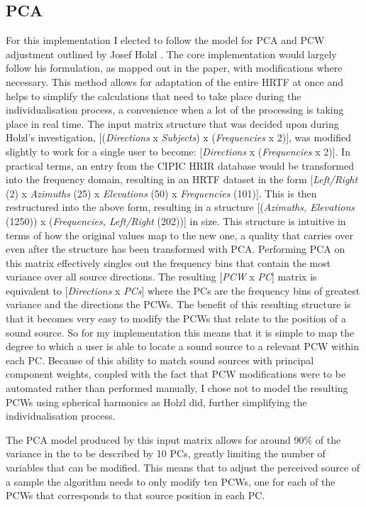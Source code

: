 \subsection{PCA}
For this implementation I elected to follow the model for PCA and PCW adjustment outlined by Josef Holzl \citep{Holzl2014a}. The core implementation would largely follow his formulation, as mapped out in the paper, with modifications where necessary. This method allows for adaptation of the entire HRTF at once and helps to simplify the calculations that need to take place during the individualisation process, a convenience when a lot of the processing is taking place in real time. The input matrix structure that was decided upon during Holzl's investigation, [(\textit{Directions} x \textit{Subjects}) x (\textit{Frequencies} x 2)], was modified slightly to work for a single user to become: [\textit{Directions} x (\textit{Frequencies} x 2)]. In practical terms, an entry from the CIPIC HRIR database would be transformed into the frequency domain, resulting in an HRTF dataset in the form [\textit{Left/Right} (2) x \textit{Azimuths} (25) x \textit{Elevations} (50) x \textit{Frequencies} (101)]. This is then restructured into the above form, resulting in a structure [(\textit{Azimuths, Elevations} (1250)) x (\textit{Frequencies, Left/Right} (202))] in size. This structure is intuitive in terms of how the original values map to the new one, a quality that carries over even after the structure has been transformed with PCA. Performing PCA on this matrix effectively singles out the frequency bins that contain the most variance over all source directions. The resulting [\textit{PCW} x \textit{PC}] matrix is equivalent to [\textit{Directions} x \textit{PCs}] where the PCs are the frequency bins of greatest variance and the directions the PCWs. The benefit of this resulting structure is that it becomes very easy to modify the PCWs that relate to the position of a sound source. So for my implementation this means that it is simple to map the degree to which a user is able to locate a sound source to a relevant PCW within each PC. Because of this ability to match sound sources with principal component weights, coupled with the fact that PCW modifications were to be automated rather than performed manually, I chose not to model the resulting PCWs using spherical harmonics as Holzl did, further simplifying the individualisation process. 

The PCA model produced by this input matrix allows for around 90\% of the variance in the to be described by 10 PCs, greatly limiting the number of variables that can be modified. This means that to adjust the perceived source of a sample the algorithm needs to only modify ten PCWs, one for each of the PCWs that corresponds to that source position in each PC. 

